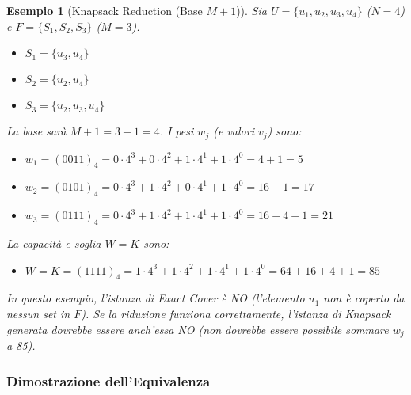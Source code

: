 \documentclass[a4paper, 11pt]{book} %
\newtheorem{example}[theorem]{Esempio}
\theoremstyle{definition}
\begin{document}
\begin{example}[Knapsack Reduction (Base $M+1$)]
Sia $U = \{u_1, u_2, u_3, u_4\}$ ($N=4$) e $F = \{S_1, S_2, S_3\}$ ($M=3$).
\begin{itemize}
    \item $S_1 = \{u_3, u_4\}$
    \item $S_2 = \{u_2, u_4\}$
    \item $S_3 = \{u_2, u_3, u_4\}$
\end{itemize}
La base sarà $M+1 = 3+1 = 4$.
I pesi $w_j$ (e valori $v_j$) sono:
\begin{itemize}
    \item $w_1 = (0011)_4 = 0 \cdot 4^3 + 0 \cdot 4^2 + 1 \cdot 4^1 + 1 \cdot 4^0 = 4+1 = 5$
    \item $w_2 = (0101)_4 = 0 \cdot 4^3 + 1 \cdot 4^2 + 0 \cdot 4^1 + 1 \cdot 4^0 = 16+1 = 17$
    \item $w_3 = (0111)_4 = 0 \cdot 4^3 + 1 \cdot 4^2 + 1 \cdot 4^1 + 1 \cdot 4^0 = 16+4+1 = 21$
\end{itemize}
La capacità e soglia $W=K$ sono:
\begin{itemize}
    \item $W = K = (1111)_4 = 1 \cdot 4^3 + 1 \cdot 4^2 + 1 \cdot 4^1 + 1 \cdot 4^0 = 64+16+4+1 = 85$
\end{itemize}
In questo esempio, l'istanza di Exact Cover è NO (l'elemento $u_1$ non è coperto da nessun set in $F$). Se la riduzione funziona correttamente, l'istanza di Knapsack generata dovrebbe essere anch'essa NO (non dovrebbe essere possibile sommare $w_j$ a 85).
\end{example}

\subsubsection{Dimostrazione dell'Equivalenza}
\end{document}
